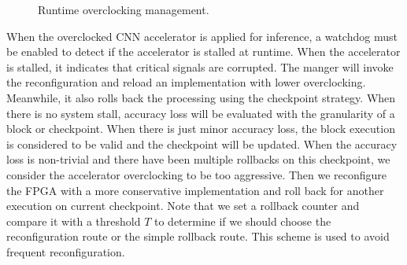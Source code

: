\begin{figure}
    \caption{Runtime overclocking management.}
\label{fig:runtime-management}
\vspace{-1em}
\end{figure}

When the overclocked CNN accelerator is applied for inference, 
a watchdog must be enabled to detect if the accelerator is stalled 
at runtime. When the accelerator is stalled, it indicates that critical 
signals are corrupted. The manger will invoke the reconfiguration 
and reload an implementation with lower overclocking. Meanwhile, 
it also rolls back the processing using the checkpoint strategy. 
When there is no system stall, accuracy loss will be evaluated 
with the granularity of a block or checkpoint. 
When there is just minor accuracy loss, the block execution is 
considered to be valid and the checkpoint will 
be updated. When the accuracy loss is non-trivial and there have been multiple rollbacks 
on this checkpoint, we consider the accelerator overclocking to be too aggressive.
Then we reconfigure the FPGA with a more conservative implementation 
and roll back for another execution on current checkpoint.
Note that we set a rollback counter and compare it with a threshold $T$ 
to determine if we should choose the reconfiguration route or the simple rollback route.
This scheme is used to avoid frequent reconfiguration.



